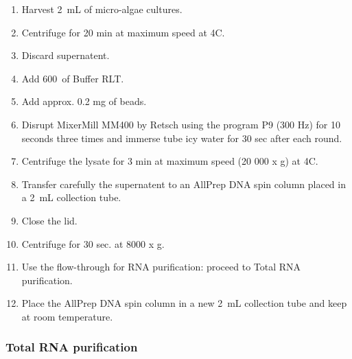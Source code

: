 \begin{enumerate}
\item Harvest 2~mL of micro-algae cultures.
\item Centrifuge for 20 min at maximum speed at 4\degree C.
\item Discard supernatent.
\item Add 600~\uL of Buffer RLT.
\item Add approx. 0.2 mg of beads. 
\item Disrupt MixerMill MM400 by Retsch using the program P9 (300 Hz) for 10 seconds three times and immerse tube icy water for 30 sec after each round.
\item Centrifuge the lysate for 3 min at maximum speed (20 000 x g) at 4\degree C.
\item Transfer carefully the supernatent to an AllPrep DNA spin column placed in a 2~mL collection tube.
\item Close the lid.
\item Centrifuge for 30 sec. at 8000 x g.
\item Use the flow-through for RNA purification: proceed to Total RNA purification.
\item Place the AllPrep DNA spin column in a new 2~mL collection tube and keep at room temperature.
\end{enumerate}

\subsubsection{Total RNA purification}


